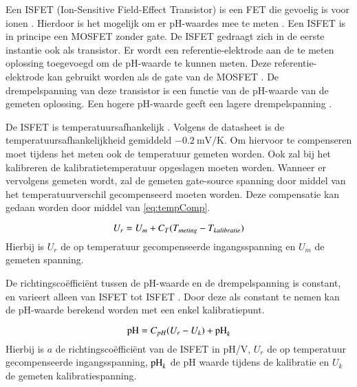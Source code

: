 Een ISFET (Ion-Sensitive Field-Effect Transistor) is een FET die gevoelig is voor ionen \cite{iontjes}. Hierdoor is het mogelijk om er pH-waardes mee te meten \cite{modeling,iontjes}. Een ISFET is in principe een MOSFET zonder gate. De ISFET gedraagt zich in de eerste instantie ook als transistor. Er wordt een referentie-elektrode aan de te meten oplossing toegevoegd om de pH-waarde te kunnen meten. Deze referentie-elektrode kan gebruikt worden als de gate van de MOSFET \cite{van1987isfet,iontjes}. De drempelspanning van deze transistor is een functie van de pH-waarde van de gemeten oplossing. Een hogere pH-waarde geeft een lagere drempelspanning \cite{isfet,iontjes}.

De ISFET is temperatuursafhankelijk \cite{isfet,iontjes}. Volgens de datasheet is de temperatuursafhankelijkheid gemiddeld $\qty{-0.2}{\milli\volt\per\kelvin}$\cite{Microsens-MSFET}. Om hiervoor te compenseren moet tijdens het meten ook de temperatuur gemeten worden. Ook zal bij het kalibreren de kalibratietemperatuur opgeslagen moeten worden. Wanneer er vervolgens gemeten wordt, zal de gemeten gate-source spanning door middel van het temperatuurverschil gecompenseerd moeten worden. Deze compensatie kan gedaan worden door middel van \cref{eq:tempComp}.

\begin{equation}\label{eq:tempComp}
    U_r = U_m + C_T(T_{meting} - T_{kalibratie})
    \tagaddtext{[\si{\volt}]}
\end{equation}
Hierbij is $U_r$ de op temperatuur gecompenseerde ingangsspanning en $U_m$ de gemeten spanning.

De richtingscoëfficiënt tussen de pH-waarde en de drempelspanning is constant, en varieert alleen van ISFET tot ISFET \cite{Microsens-MSFET}. Door deze als constant te nemen kan de pH-waarde berekend worden met een enkel kalibratiepunt.

\begin{equation}\label{eq:calcPH}
    \ph = C_{pH}(U_r - U_k) + \ph_k
    \tagaddtext{[pH]}
\end{equation}
Hierbij is $a$ de richtingscoëfficiënt van de ISFET in pH/V, $U_r$ de op temperatuur gecompenseerde ingangsspanning, $\mathrm{pH}_k$ de pH waarde tijdens de kalibratie en $U_k$ de gemeten kalibratiespanning.
